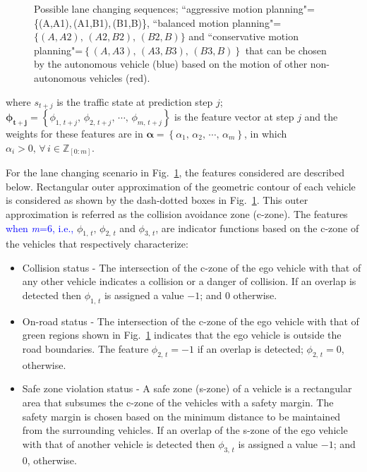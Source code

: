 \documentclass[10pt,journal]{IEEEtran}
\begin{document}
\begin{figure}
\begin{centering}
\begin{tikzpicture}
			\end{tikzpicture}
			\par\end{centering}
		\protect\caption{Possible lane changing sequences; ``aggressive motion planning"= \{(A,A1),\,(A1,B1),\,(B1,B)\}, ``balanced motion planning"=$\{\left(A,A2\right),\,\left(A2,B2\right),\,\left(B2,B\right)\}$ and ``conservative motion planning"=$\left\{\left(A,A3\right),\,\left(A3,B3\right),\,\left(B3,B\right)\right\}$ that can be chosen by the autonomous vehicle (blue) based on the motion of other non-autonomous vehicles (red).}
		\label{fig:lane_changing}
	\end{figure}
	
	
	
	\noindent where $s_{t+j}$ is the traffic state  at prediction step $j$;  $\boldsymbol{{\phi}_{t+j}} = \left\{\phi_{1,\,{t+j}},\,\phi_{2,\,{t+j}},\,\cdots,\,\phi_{m,\,{t+j}}\right\}$ is the feature vector at step $j$ and the weights for these features are in  $\boldsymbol{{\alpha}} = \left\{\alpha_{1},\,\alpha_{2},\,\cdots,\,\alpha_{m}\right\}$, in which $\alpha_{i}>0,\,\forall \, i\in \mathbb{Z}_{\left[0:m\right]}$. 
	
	For the lane changing scenario in  Fig.~\ref{fig:lane_changing}, the  features considered are described below. Rectangular outer approximation of the geometric contour of each vehicle is considered as shown by the dash-dotted boxes in Fig.~\ref{fig:lane_changing}. This outer approximation is referred as the collision avoidance zone (c-zone). The features \textcolor{blue}{when \textit{m}=6, i.e.,} $\phi_{1,\,{t}},\,\phi_{2,\,{t}}$ and $\phi_{3,\,{t}}$, are indicator functions based on the c-zone of the vehicles that respectively characterize:
	\begin{itemize}
		\item Collision status - The intersection of the c-zone of the ego vehicle with that of any other vehicle indicates a collision or a danger of collision. If an overlap is detected then $\phi_{1,\,{t}}$ is assigned a value $-1$; and $0$ otherwise.
		
		\item On-road status - The intersection of the c-zone of the ego vehicle with that of green regions shown in Fig.~\ref{fig:lane_changing} indicates that the ego vehicle is outside the road boundaries. The feature $\phi_{2,\,{t}} = -1$ if an overlap is detected; $\phi_{2,\,{t}} = 0$, otherwise.
		
		\item Safe zone violation status - A safe zone (s-zone) of a vehicle is a rectangular area that subsumes the c-zone of the vehicles with a safety margin. The safety margin is chosen based on the minimum distance to be maintained from the surrounding vehicles. If an overlap of the s-zone of the ego vehicle with that of another vehicle is detected then $\phi_{3,\,{t}}$ is assigned a value $-1$; and $0$, otherwise.		
		
		
	\end{itemize}
	
\end{document}
